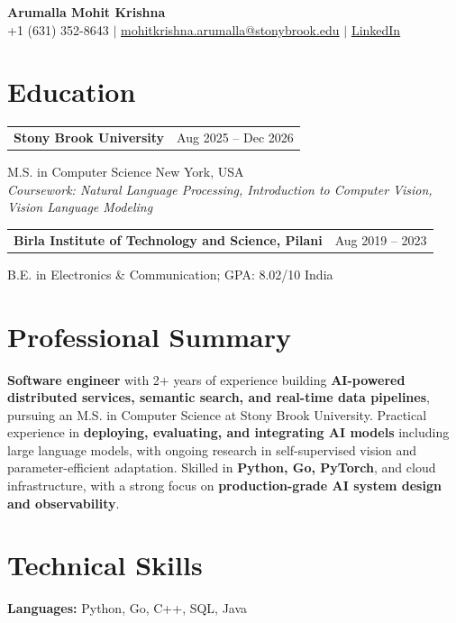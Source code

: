 \documentclass[letterpaper,10pt]{article}
\makeatletter
\newcommand{\entry}[2]{%
  \noindent
  \begin{tabularx}{\linewidth}
    {@{}>{\raggedright\arraybackslash}X@{\hspace{6pt}}r@{}}
    \textbf{#1} & #2
  \end{tabularx}\par
}
\makeatother
\begin{document}
\begin{center}
    {\LARGE\bfseries Arumalla Mohit Krishna}\\[3pt]
    +1 (631) 352-8643 $|$
    \href{mailto:mohitkrishna.arumalla@stonybrook.edu}
    {mohitkrishna.arumalla@stonybrook.edu} $|$
    \href{https://linkedin.com/in/mohit-krishna-arumalla}
    {LinkedIn}
\end{center}
\vspace{-8pt}

\section{Education}

\entry
  {\textbf{Stony Brook University}}
  {Aug 2025 -- Dec 2026}

M.S. in Computer Science \hfill New York, USA\\
\textit{
Coursework: Natural Language Processing,
Introduction to Computer Vision, Vision Language Modeling
}
\vspace{3pt}

\entry
  {\textbf{Birla Institute of Technology and Science, Pilani}}
  {Aug 2019 -- 2023}

B.E. in Electronics \& Communication; GPA: 8.02/10 \hfill India
\section{Professional Summary}

\textbf{Software engineer} with 2+ years of experience building \textbf{AI-powered distributed services, semantic search, and real-time data pipelines}, pursuing an M.S. in Computer Science at Stony Brook University. Practical experience in \textbf{deploying, evaluating, and integrating AI models} including large language models, with ongoing research in self-supervised vision and parameter-efficient adaptation. Skilled in \textbf{Python, Go, PyTorch}, and cloud infrastructure, with a strong focus on \textbf{production-grade AI system design and observability}.

\section{Technical Skills}

\textbf{Languages:}
Python, Go, C++, SQL, Java\\
\end{document}
